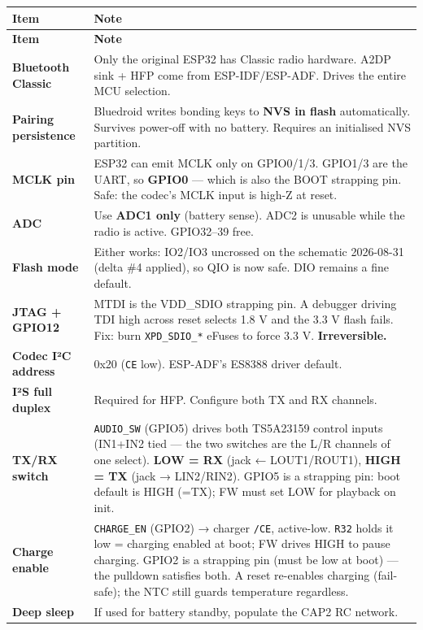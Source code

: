 \documentclass[11pt]{article}
\begin{document}
\footnotesize
\begin{longtable}{@{}L{3.2cm} L{\dimexpr\linewidth-3.9cm}@{}}
\toprule
\textbf{Item} & \textbf{Note} \\
\midrule
\endfirsthead
\toprule
\textbf{Item} & \textbf{Note} \\
\midrule
\endhead
\textbf{Bluetooth Classic} & Only the original ESP32 has Classic radio hardware. A2DP sink + HFP come from ESP-IDF/ESP-ADF. Drives the entire MCU selection. \\
\textbf{Pairing persistence} & Bluedroid writes bonding keys to \textbf{NVS in flash} automatically. Survives power-off with no battery. Requires an initialised NVS partition. \\
\textbf{MCLK pin} & ESP32 can emit MCLK only on GPIO0/1/3. GPIO1/3 are the UART, so \textbf{GPIO0} — which is also the BOOT strapping pin. Safe: the codec's MCLK input is high-Z at reset. \\
\textbf{ADC} & Use \textbf{ADC1 only} (battery sense). ADC2 is unusable while the radio is active. GPIO32–39 free. \\
\textbf{Flash mode} & Either works: IO2/IO3 uncrossed on the schematic 2026-08-31 (delta \#4 applied), so QIO is now safe. DIO remains a fine default. \\
\textbf{JTAG + GPIO12} & MTDI is the VDD_SDIO strapping pin. A debugger driving TDI high across reset selects 1.8 V and the 3.3 V flash fails. Fix: burn \texttt{XPD_SDIO_*} eFuses to force 3.3 V. \textbf{Irreversible.} \\
\textbf{Codec I²C address} & 0x20 (\texttt{CE} low). ESP-ADF's ES8388 driver default. \\
\textbf{I²S full duplex} & Required for HFP. Configure both TX and RX channels. \\
\textbf{TX/RX switch} & \texttt{AUDIO_SW} (GPIO5) drives both TS5A23159 control inputs (IN1+IN2 tied — the two switches are the L/R channels of one select). \textbf{LOW = RX} (jack ← LOUT1/ROUT1), \textbf{HIGH = TX} (jack → LIN2/RIN2). GPIO5 is a strapping pin: boot default is HIGH (=TX); FW must set LOW for playback on init. \\
\textbf{Charge enable} & \texttt{CHARGE_EN} (GPIO2) → charger \texttt{/CE}, active-low. \texttt{R32} holds it low = charging enabled at boot; FW drives HIGH to pause charging. GPIO2 is a strapping pin (must be low at boot) — the pulldown satisfies both. A reset re-enables charging (fail-safe); the NTC still guards temperature regardless. \\
\textbf{Deep sleep} & If used for battery standby, populate the CAP2 RC network. \\

\end{longtable}
\end{document}

